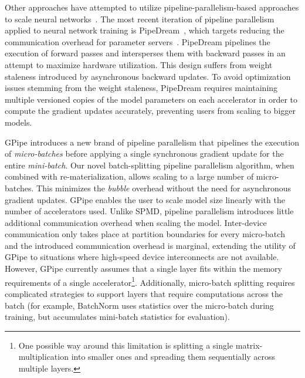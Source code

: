 \documentclass{article}
\def\codename{GPipe}
\begin{document}
Other approaches have attempted to utilize pipeline-parallelism-based approaches to scale neural networks~\cite{petrowski93perf,wu2016google}. The most recent iteration of pipeline parallelism applied to neural network training is PipeDream~\cite{harlap2018pipedream}, which targets reducing the communication overhead for parameter servers~\cite{li2014scaling}. PipeDream pipelines the execution of forward passes and intersperses them with backward passes in an attempt to maximize hardware utilization. This design suffers from weight staleness introduced by asynchronous backward updates. To avoid optimization issues stemming from the weight staleness, PipeDream requires maintaining multiple versioned copies of the model parameters on each accelerator in order to compute the gradient updates accurately, preventing users from scaling to bigger models.

\codename{} introduces a new brand of pipeline parallelism that pipelines the execution of \textit{micro-batches} before applying a single synchronous gradient update for the entire \textit{mini-batch}. Our novel batch-splitting pipeline parallelism algorithm, when combined with re-materialization, allows scaling to a large number of micro-batches. This minimizes the \textit{bubble} overhead without the need for asynchronous gradient updates. 
\codename{} enables the user to scale model size linearly with the number of accelerators used. Unlike SPMD, pipeline parallelism introduces little additional communication overhead when scaling the model. Inter-device communication only takes place at partition boundaries for every micro-batch and the introduced communication overhead is marginal, extending the utility of \codename{} to situations where high-speed device interconnects are not available. However, \codename{} currently assumes that a single layer fits within the memory requirements of a single accelerator\footnote{One possible way around this limitation is splitting a single matrix-multiplication into smaller ones and spreading them sequentially across multiple layers.
}. Additionally, micro-batch splitting requires complicated strategies to support layers that require computations across the batch (for example, BatchNorm uses statistics over the micro-batch during training, but accumulates mini-batch statistics for evaluation).
\end{document}
